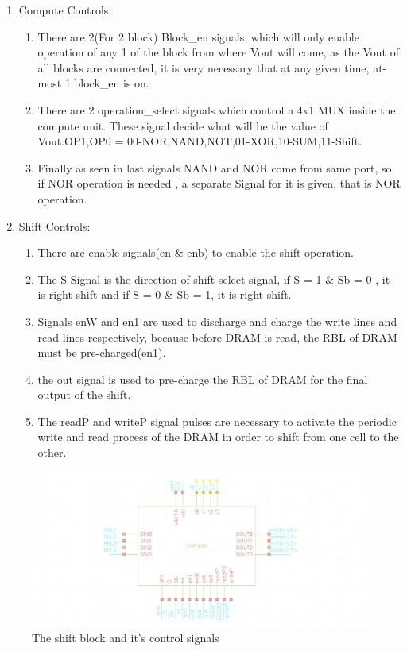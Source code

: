 \begin{enumerate}
\item Compute  Controls:
\begin{enumerate}
\item There are 2(For 2 block) Block\_en signals, which will only enable operation of any 1 of the block from where Vout will come, as the Vout of all blocks are connected, it is very necessary that at any given time, at-most 1 block\_en is on.
\item There are 2 operation\_select signals which control a 4x1 MUX inside the compute unit. These signal decide what will be the value of Vout.{OP1,OP0} = {00-NOR,NAND,NOT},{01-XOR},{10-SUM},{11-Shift}.
\item Finally as seen in last signals NAND and NOR come from same port, so if NOR operation is needed , a separate Signal for it is given, that is NOR operation. 
\end{enumerate}
\item Shift Controls:
\begin{enumerate}
\item There are enable signals(en \& enb) to enable the shift operation. 
\item The S Signal is the direction of shift select signal, if S = 1 \& Sb = 0 , it is right shift and if S = 0 \& Sb = 1, it is right shift.
\item Signals enW and en1 are used to discharge and charge the write lines and read lines respectively, because before DRAM is read, the RBL of DRAM must be pre-charged(en1).
\item the out signal is used to pre-charge the RBL of DRAM for the final output of the shift. 
\item The readP and writeP signal pulses are necessary to activate the periodic write and read process of the DRAM in order to shift from one cell to the other. 
\end{enumerate}

\end{enumerate}

\begin{figure}[H]
\centering
\includegraphics[width=1.2\textwidth]{shiftsym.jpg}
\caption{The shift block and it's control signals}
\label{fig:Figure}
\end{figure}